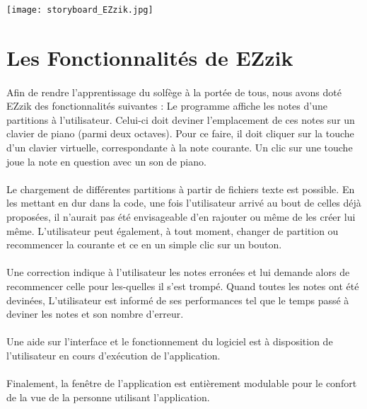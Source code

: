 \documentclass[a4paper, 12pt]{article}
\begin{document}
    \begin{landscape}
    \begin{center}
    \texttt{[image: storyboard\_EZzik.jpg]}
    \end{center}
    \end{landscape}

\section{Les Fonctionnalités de EZzik}
    \paragraph{}
    Afin de rendre l'apprentissage du solfège à la portée de tous, nous avons doté EZzik des fonctionnalités suivantes : Le programme affiche les notes d'une partitions à l'utilisateur. Celui-ci doit deviner l'emplacement de ces notes sur un clavier de piano (parmi deux octaves). Pour ce faire, il doit cliquer sur la touche d'un clavier virtuelle, correspondante à la note courante. Un clic sur une touche joue la note en question avec un son de piano.
    \paragraph{}
    Le chargement de différentes partitions à partir de fichiers texte est possible. En les mettant en dur dans la code, une fois l'utilisateur arrivé au bout de celles déjà proposées, il n'aurait pas été envisageable d'en rajouter ou même de les créer lui même. L'utilisateur peut également, à tout moment, changer de partition ou recommencer la courante et ce en un simple clic sur un bouton.
    \paragraph{}
    Une correction indique à l'utilisateur les notes erronées et lui demande alors de recommencer celle pour les-quelles il s'est trompé. Quand toutes les notes ont été devinées, L'utilisateur est informé de ses performances tel que le temps passé à deviner les notes et son nombre d'erreur.
    \paragraph{}
    Une aide sur l'interface et le fonctionnement du logiciel est à disposition de l'utilisateur en cours d'exécution de l'application.
    \paragraph{}
    Finalement, la fenêtre de l'application est entièrement modulable pour le confort de la vue de la personne utilisant l'application.
\end{document}
